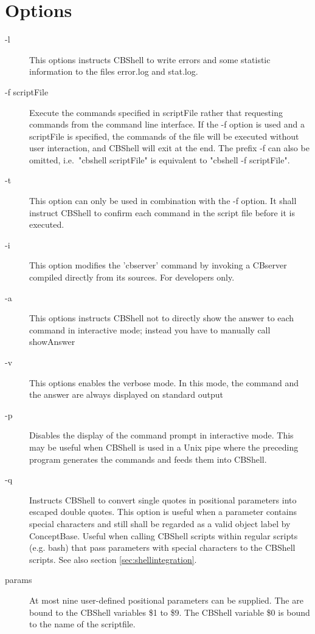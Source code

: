 \section{Options} 


\begin{description}

\item[-l] This options instructs CBShell to write errors and some statistic information
to the files error.log and stat.log.

\item[-f scriptFile] Execute the commands specified in scriptFile rather that requesting commands
from the command line interface. If the -f option is used and a scriptFile
is specified, the commands of the file will be executed without user interaction,
and CBShell will exit at the end. The prefix -f can also be omitted, i.e.\
"cbshell scriptFile" is equivalent to "cbshell -f scriptFile".

\item[-t] This option can only be used in combination with the -f option. It shall instruct CBShell
to confirm each command in the script file before it is executed.

\item[-i] This option modifies the 'cbserver' command by invoking a CBserver compiled directly from its sources.
For developers only.

\item[-a] This options instructs CBShell not to directly show the answer to
   each command in interactive mode;  instead you have to manually call showAnswer

\item[-v] This options enables the verbose mode. In this mode, the command and the answer
   are always displayed on standard output

\item[-p] Disables the display of the command prompt in interactive mode. This may be
useful when CBShell is used in a Unix pipe where the preceding program generates the
commands and feeds them into CBShell.

\item[-q] Instructs CBShell to convert single quotes in positional parameters into escaped double quotes.
This option is useful when a parameter contains special characters and still shall be regarded as a valid
object label by ConceptBase. Useful when calling CBShell scripts within regular scripts (e.g. bash)
that pass parameters with special characters to the CBShell scripts.
See also section \ref{sec:shellintegration}.

\item[params] At most nine user-defined positional parameters can be supplied. The are bound
to the CBShell variables \$1 to \$9. The CBShell variable \$0 is bound to the name of the scriptfile.

\end{description}


